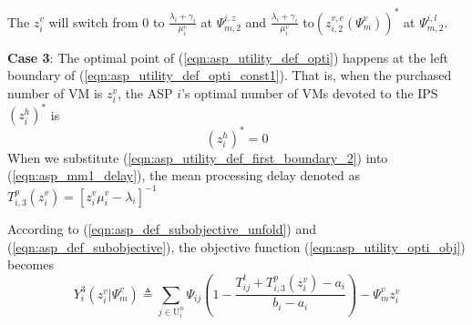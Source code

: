\documentclass[conference]{IEEEtran}
\newtheorem{lemma}{Lemma}
\begin{document}
The $z_i^v$ will switch from $0$ to $\frac{\lambda_i+\gamma_i}{\mu_i^v}$ at $\Psi_{m,2}^{i,z}$ and $\frac{\lambda_i+\gamma_i}{\mu_i^v}$ to$(z_{i,2}^{v,e}(\Psi_m^v))^*$ at $\Psi_{m,2}^{i,l}$.
\fi

\textbf{Case 3}: The optimal point of (\ref{eqn:asp_utility_def_opti}) happens at the left boundary of (\ref{eqn:asp_utility_def_opti_const1}). That is, when the purchased number of VM is $z_i^v$, the ASP $i$'s optimal number of VMs devoted to the IPS $(z_i^h)^*$ is
\begin{equation} \label{eqn:asp_utility_def_first_boundary_2}
(z_i^h)^* = 0
\end{equation}
When we substitute (\ref{eqn:asp_utility_def_first_boundary_2}) into (\ref{eqn:asp_mm1_delay}), the mean processing delay denoted as $T_{i,3}^p(z_i^v) = [z_i^v \mu_i^v-\lambda_i]^{-1}$

According to (\ref{eqn:asp_def_subobjective_unfold}) and (\ref{eqn:asp_def_subobjective}), the objective function (\ref{eqn:asp_utility_opti_obj}) becomes
\begin{equation}\label{eqn:asp_case3_objective}
Y_i^3(z_i^v|\Psi_m^v) \triangleq \sum_{j \in \mathrm{U}_i^n}\Psi_{ij}(1-\frac{T_{ij}^t + T_{i,3}^p(z_i^v)-a_i}{b_i-a_i}) - \Psi_m^vz_i^v
\end{equation}

\end{document}
